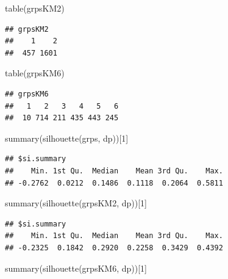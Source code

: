 \documentclass[
]{article}
\newenvironment{Shaded}{\begin{snugshade}}{\end{snugshade}}
\newcommand{\DecValTok}[1]{\textcolor[rgb]{0.00,0.00,0.81}{#1}}
\newcommand{\FunctionTok}[1]{\textcolor[rgb]{0.00,0.00,0.00}{#1}}
\newcommand{\NormalTok}[1]{#1}
\begin{document}
\begin{Shaded}
\begin{Highlighting}[]
\FunctionTok{table}\NormalTok{(grpsKM2)}
\end{Highlighting}
\end{Shaded}

\begin{verbatim}
## grpsKM2
##    1    2 
##  457 1601
\end{verbatim}

\begin{Shaded}
\begin{Highlighting}[]
\FunctionTok{table}\NormalTok{(grpsKM6)}
\end{Highlighting}
\end{Shaded}

\begin{verbatim}
## grpsKM6
##   1   2   3   4   5   6 
##  10 714 211 435 443 245
\end{verbatim}

\begin{Shaded}
\begin{Highlighting}[]
\FunctionTok{summary}\NormalTok{(}\FunctionTok{silhouette}\NormalTok{(grps, dp))[}\DecValTok{1}\NormalTok{]}
\end{Highlighting}
\end{Shaded}

\begin{verbatim}
## $si.summary
##    Min. 1st Qu.  Median    Mean 3rd Qu.    Max. 
## -0.2762  0.0212  0.1486  0.1118  0.2064  0.5811
\end{verbatim}

\begin{Shaded}
\begin{Highlighting}[]
\FunctionTok{summary}\NormalTok{(}\FunctionTok{silhouette}\NormalTok{(grpsKM2, dp))[}\DecValTok{1}\NormalTok{]}
\end{Highlighting}
\end{Shaded}

\begin{verbatim}
## $si.summary
##    Min. 1st Qu.  Median    Mean 3rd Qu.    Max. 
## -0.2325  0.1842  0.2920  0.2258  0.3429  0.4392
\end{verbatim}

\begin{Shaded}
\begin{Highlighting}[]
\FunctionTok{summary}\NormalTok{(}\FunctionTok{silhouette}\NormalTok{(grpsKM6, dp))[}\DecValTok{1}\NormalTok{]}
\end{Highlighting}
\end{Shaded}
\end{document}
